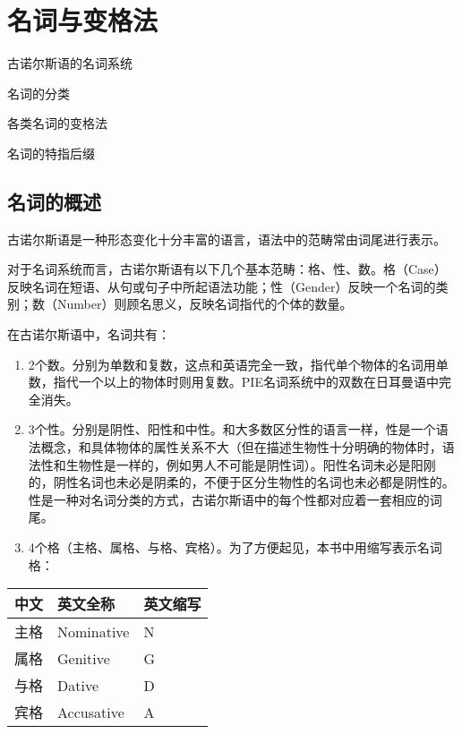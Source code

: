 \chapter{名词与变格法}
\label{名词与变格法}

\begin{introduction}[章节要点]
    \item 古诺尔斯语的名词系统
    \item 名词的分类
    \item 各类名词的变格法
    \item 名词的特指后缀
\end{introduction}

\section{名词的概述}
\label{名词的概述}

古诺尔斯语是一种形态变化十分丰富的语言，语法中的范畴常由词尾进行表示。

对于名词系统而言，古诺尔斯语有以下几个基本范畴：格、性、数。格（Case）反映名词在短语、从句或句子中所起语法功能；性（Gender）反映一个名词的类别；数（Number）则顾名思义，反映名词指代的个体的数量。

在古诺尔斯语中，名词共有：

\begin{enumerate}[1)]

  \item
        2个数。分别为单数和复数，这点和英语完全一致，指代单个物体的名词用单数，指代一个以上的物体时则用复数。PIE名词系统中的双数在日耳曼语中完全消失。
  \item
        3个性。分别是阴性、阳性和中性。和大多数区分性的语言一样，性是一个语法概念，和具体物体的属性关系不大（但在描述生物性十分明确的物体时，语法性和生物性是一样的，例如男人不可能是阴性词）。阳性名词未必是阳刚的，阴性名词也未必是阴柔的，不便于区分生物性的名词也未必都是阴性的。性是一种对名词分类的方式，古诺尔斯语中的每个性都对应着一套相应的词尾。
  \item
        4个格（主格、属格、与格、宾格）。为了方便起见，本书中用缩写表示名词格：
\end{enumerate}

\begin{longtable}{lll}
  \toprule
  \textbf{中文} & \textbf{英文全称}   & \textbf{英文缩写} \\
  \midrule
  \endhead
  \bottomrule
  \endfoot
  主格 & Nominative & N        \\
  属格 & Genitive   & G        \\
  与格 & Dative     & D        \\
  宾格 & Accusative & A        \\
\end{longtable}

